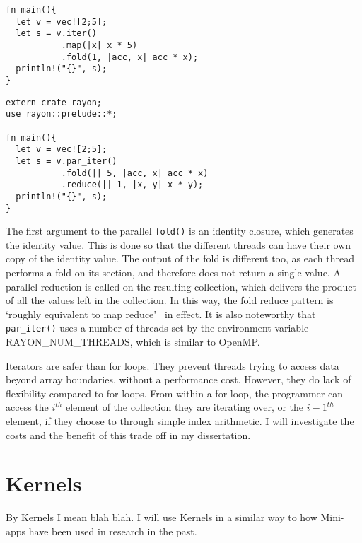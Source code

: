 \noindent\begin{minipage}{.49\textwidth}
\begin{code}
\begin{verbatim}
fn main(){
  let v = vec![2;5];
  let s = v.iter()
           .map(|x| x * 5)
           .fold(1, |acc, x| acc * x);
  println!("{}", s);
}
\end{verbatim}
\label{lst:rust-seq-iter}
\end{code}
\end{minipage}\hfill
\begin{minipage}{.49\textwidth}
\begin{code}
\begin{verbatim}
extern crate rayon;
use rayon::prelude::*;

fn main(){
  let v = vec![2;5];
  let s = v.par_iter()
           .fold(|| 5, |acc, x| acc * x)
           .reduce(|| 1, |x, y| x * y);
  println!("{}", s);
}
\end{verbatim}
\label{lst:rust-par-iter}
\label{lst:iters-a}
\end{code}
\end{minipage}

The first argument to the parallel \texttt{fold()} is an identity closure, which generates the identity value. This is done so that the different threads can have their own copy of the identity value. The output of the fold is different too, as each thread performs a fold on its section, and therefore does not return a single value. A parallel reduction is called on the resulting collection, which delivers the product of all the values left in the collection.
In this way, the fold reduce pattern is `roughly equivalent to map reduce'~\cite{rayonFold} in effect. It is also noteworthy that \texttt{par\_iter()} uses a number of threads set by the environment variable RAYON\_NUM\_THREADS, which is similar to OpenMP\@.

Iterators are safer than for loops. They prevent threads trying to access data beyond array boundaries, without a performance cost. However, they do lack of flexibility compared to for loops. From within a for loop, the programmer can access the $i^{th}$ element of the collection they are iterating over, or the $i-1^{th}$ element, if they choose to through simple index arithmetic. I will investigate the costs and the benefit of this trade off in my dissertation.

\section{Kernels}
By Kernels I mean blah blah. I will use Kernels in a similar way to how Mini-apps have been used in research in the past.

